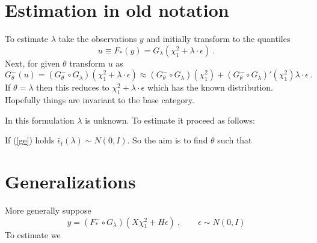 \documentclass[a4paper,12pt]{article}
\newcommand{\eps}{\epsilon}
\begin{document}
\section{Estimation in old notation}
To estimate $\lambda$ take the observations $y$ and initially transform to the quantiles
$$
u\equiv F_*(y) = G_\lambda(\chi_1^2+\lambda\cdot\eps)\ .
$$
Next, for given $\theta$ transform $u$ as
$$
G_\theta^-(u) = (G_\theta^- \circ G_\lambda)(\chi_1^2+\lambda\cdot\eps)\approx (G_\theta^-\circ G_\lambda)(\chi_1^2) + (G_\theta^-\circ G_\lambda)'(\chi_1^2)\lambda\cdot\eps\ .
$$
If $\theta=\lambda$ then this reduces to $\chi_1^2+\lambda\cdot\eps$ which has the known distribution. Hopefully things are invariant to the base category.

In this formulation $\lambda$ is unknown.  To estimate it proceed as follows:


If (\ref{ge}) holds $\hat\eps_t(\lambda)\sim N(0,I)$.  So the aim is to find $\theta$ such that

\section*{Generalizations}
More generally suppose
\begin{equation}\label{ge2}
y=(F_*^-\circ G_\lambda)(X\chi_1^2+H\eps)\ , \qquad \eps \sim N(0,I)
\end{equation}
To estimate we
\end{document}
